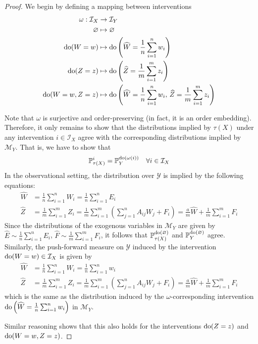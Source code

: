 \medskip

\begin{proof}
We begin by defining a mapping between interventions
\begin{align*}
\omega : \mathcal{I}_X &\rightarrow \mathcal{I}_Y \\
\varnothing &\mapsto \varnothing \\
\operatorname{do}(W= w)&\mapsto \operatorname{do}\left(\widehat{W} = \frac{1}{n}\sum_{i=1}^n w_i\right) \\
\operatorname{do}(Z= z)&\mapsto \operatorname{do}\left(\widehat{Z} = \frac{1}{m}\sum_{i=1}^m z_i\right) \\
\operatorname{do}(W=w, Z=z)&\mapsto \operatorname{do}\left(\widehat{W} = \frac{1}{n}\sum_{i=1}^n w_i,\, \widehat{Z} = \frac{1}{m}\sum_{i=1}^m z_i\right)
\end{align*}

Note that $\omega$ is surjective and order-preserving (in fact, it is an order embedding).
Therefore, it only remains to show that the distributions implied by $\tau(X)$ under any intervention $i\in\mathcal{I}_X$ agree with the corresponding distributions implied by $\mathcal{M}_Y$.
That is, we have to show that
\[ \mathbb{P}_{\tau(X)}^{i} = \mathbb{P}_{Y}^{\operatorname{do}(\omega(i))} \quad \forall i\in\mathcal{I}_X \]
%
In the observational setting, the distribution over $\mathcal{Y}$ is implied by the following equations:
%
\begin{align*}
\widehat{W} &= \frac{1}{n}\sum_{i=1}^n W_i = \frac{1}{n}\sum_{i=1}^n E_i \\
\widehat{Z} &= \frac{1}{m}\sum_{i=1}^m Z_i =  \frac{1}{m}\sum_{i=1}^m \left( \sum_{j=1}^n A_{ij}W_j  + F_i\right) = \frac{a}{m}\widehat{W} +  \frac{1}{m}\sum_{i=1}^m F_i
\end{align*}
%
Since the distributions of the exogenous variables in $\mathcal{M}_Y$ are given by $\widehat{E} \sim \frac{1}{n}\sum_{i=1}^n E_i$, $\widehat{F} \sim \frac{1}{m}\sum_{i=1}^m F_i$, it follows that $\mathbb{P}_{\tau(X)}^{\operatorname{do}(\varnothing)}$  and $\mathbb{P}_{Y}^{\operatorname{do}(\varnothing)}$ agree. Similarly, the push-forward measure on $\mathcal{Y}$ induced by the intervention $\operatorname{do}(W=w)\in\mathcal{I}_X$ is given by
%
\begin{align*}
\widehat{W} &= \frac{1}{n}\sum_{i=1}^n W_i = \frac{1}{n}\sum_{i=1}^n w_i \\
\widehat{Z} &= \frac{1}{m}\sum_{i=1}^m Z_i =  \frac{1}{m}\sum_{i=1}^m \left( \sum_{j=1}^n A_{ij}W_j  + F_i\right) = \frac{a}{m}\widehat{W} +  \frac{1}{m}\sum_{i=1}^m F_i
\end{align*}
which is the same as the distribution induced by the $\omega$-corresponding intervention $\operatorname{do}\left(\widehat{W} = \frac{1}{n}\sum_{i=1}^n w_i\right)$ in $\mathcal{M}_Y$.

Similar reasoning shows that this also holds for the interventions $\operatorname{do}(Z=z)$ and $\operatorname{do}(W=w, Z=z)$.

\end{proof}



